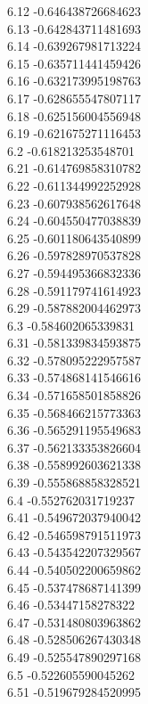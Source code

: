 {6.12	-0.646438726684623\\
6.13	-0.642843711481693\\
6.14	-0.639267981713224\\
6.15	-0.635711441459426\\
6.16	-0.632173995198763\\
6.17	-0.628655547807117\\
6.18	-0.625156004556948\\
6.19	-0.621675271116453\\
6.2	-0.618213253548701\\
6.21	-0.614769858310782\\
6.22	-0.611344992252928\\
6.23	-0.607938562617648\\
6.24	-0.604550477038839\\
6.25	-0.601180643540899\\
6.26	-0.597828970537828\\
6.27	-0.594495366832336\\
6.28	-0.591179741614923\\
6.29	-0.587882004462973\\
6.3	-0.584602065339831\\
6.31	-0.581339834593875\\
6.32	-0.578095222957587\\
6.33	-0.574868141546616\\
6.34	-0.571658501858826\\
6.35	-0.568466215773363\\
6.36	-0.565291195549683\\
6.37	-0.562133353826604\\
6.38	-0.558992603621338\\
6.39	-0.555868858328521\\
6.4	-0.552762031719237\\
6.41	-0.549672037940042\\
6.42	-0.546598791511973\\
6.43	-0.543542207329567\\
6.44	-0.540502200659862\\
6.45	-0.537478687141399\\
6.46	-0.53447158278322\\
6.47	-0.531480803963862\\
6.48	-0.528506267430348\\
6.49	-0.525547890297168\\
6.5	-0.522605590045262\\
6.51	-0.519679284520995\\
}
